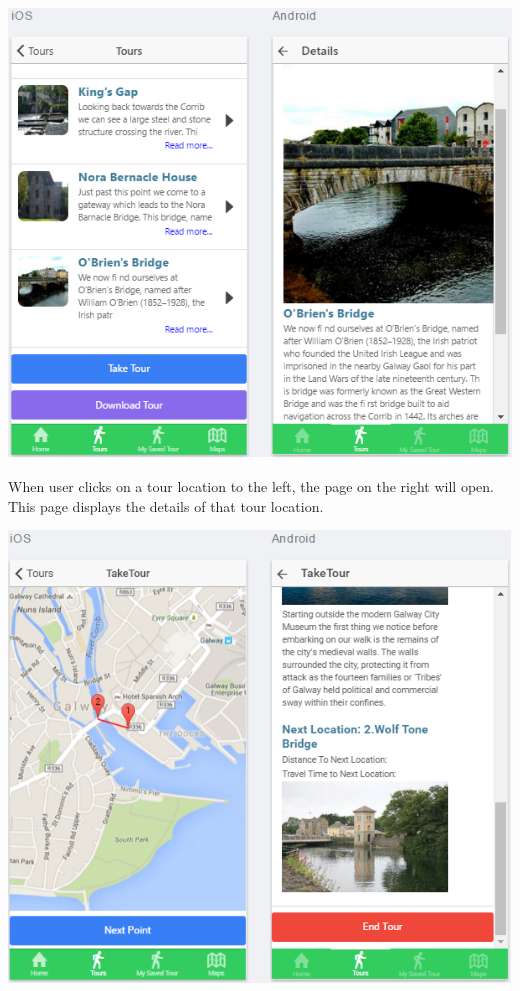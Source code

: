 		 				\begin{center}    
		 					\includegraphics{img/TourDetailTab.png}
		 				\end{center}
		 				When user clicks on a tour location to the left, the page on the right  will open. This page displays the details of that tour location.		 	
		 				\begin{center}    
		 					\includegraphics{img/TakeTourTab.png}
		 				\end{center}
